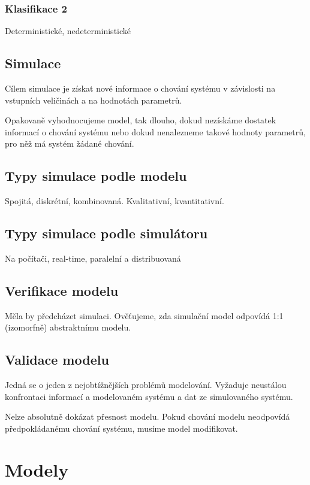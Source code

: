 \documentclass[11pt]{article}
\begin{document}
\subsubsection{Klasifikace 2}
\label{sec:org1c2b8c6}
Deterministické, nedeterministické

\subsection{Simulace}
\label{sec:org4e63120}
Cílem simulace je získat nové informace o chování systému v závislosti na
vstupních veličinách a na hodnotách parametrů.

Opakovaně vyhodnocujeme model, tak dlouho, dokud nezískáme dostatek informací o
chování systému nebo dokud nenalezneme takové hodnoty parametrů, pro něž má
systém žádané chování.

\subsection{Typy simulace podle modelu}
\label{sec:org6e1555d}
Spojitá, diskrétní, kombinovaná. Kvalitativní, kvantitativní.

\subsection{Typy simulace podle simulátoru}
\label{sec:orga727fa6}
Na počítači, real-time, paralelní a distribuovaná

\subsection{Verifikace modelu}
\label{sec:orgdcf035a}
Měla by předcházet simulaci. Ověťujeme, zda simulační model odpovídá 1:1
(izomorfně) abstraktnímu modelu.

\subsection{Validace modelu}
\label{sec:org6d51eaf}
Jedná se o jeden z nejobtížnějších problémů modelování. Vyžaduje neustálou
konfrontaci informací a modelovaném systému a dat ze simulovaného systému.

Nelze absolutně dokázat přesnost modelu. Pokud chování modelu neodpovídá
předpokládanému chování systému, musíme model modifikovat.

\section{Modely}
\label{sec:orgdd4e12b}
\end{document}

